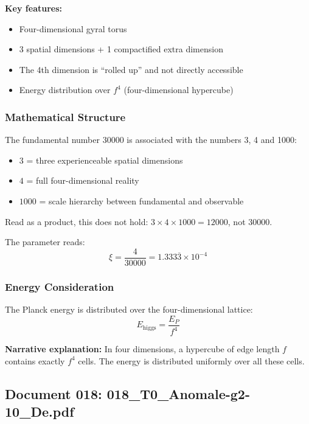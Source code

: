 	\textbf{Key features:}
	\begin{itemize}
		\item Four-dimensional gyral torus
		\item 3 spatial dimensions + 1 compactified extra dimension
		\item The 4th dimension is \enquote{rolled up} and not directly accessible
		\item Energy distribution over $f^4$ (four-dimensional hypercube)
	\end{itemize}
	
	\subsubsection{Mathematical Structure}
	
	The fundamental number 30000 is associated with the numbers 3, 4 and 1000:
	\begin{itemize}
		\item $3$ = three experienceable spatial dimensions
		\item $4$ = full four-dimensional reality
		\item $1000$ = scale hierarchy between fundamental and observable
	\end{itemize}
	Read as a product, this does not hold: $3 \times 4 \times 1000 = 12000$, not $30000$.
	
	The parameter reads:
	\begin{equation}
		\boxed{\xi = \frac{4}{30000} = 1.333\overline{3} \times 10^{-4}}
	\end{equation}
	
	\subsubsection{Energy Consideration}
	
	The Planck energy is distributed over the four-dimensional lattice:
	\begin{equation}
		E_{\text{higgs}} = \frac{E_P}{f^4}
	\end{equation}
	
	\textbf{Narrative explanation:} In four dimensions, a hypercube of edge length $f$ contains exactly $f^4$ cells. The energy is distributed uniformly over all these cells.
	
	\subsection{Document 018: 018\_T0\_Anomale-g2-10\_De.pdf}
	
